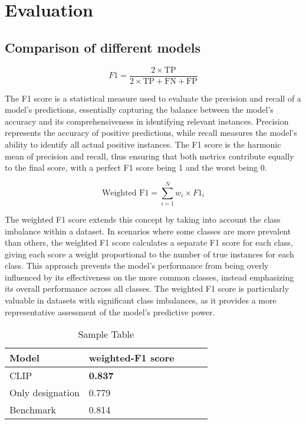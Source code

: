 \chapter{Evaluation}
\label{sec:evaluation}
\section{Comparison of different models} 

\begin{equation}
	F1 = \frac{2 \times \text{TP}}{2 \times \text{TP} + \text{FN} + \text{FP}}
\end{equation}

The F1 score is a statistical measure used to evaluate the precision and recall of a model's predictions, essentially capturing the balance between the model's accuracy and its comprehensiveness in identifying relevant instances. Precision represents the accuracy of positive predictions, while recall measures the model's ability to identify all actual positive instances. The F1 score is the harmonic mean of precision and recall, thus ensuring that both metrics contribute equally to the final score, with a perfect F1 score being 1 and the worst being 0.

\begin{equation}
	\text{Weighted F1} = \sum_{i=1}^{N} w_i \times F1_i
\end{equation}

The weighted F1 score extends this concept by taking into account the class imbalance within a dataset. In scenarios where some classes are more prevalent than others, the weighted F1 score calculates a separate F1 score for each class, giving each score a weight proportional to the number of true instances for each class. This approach prevents the model's performance from being overly influenced by its effectiveness on the more common classes, instead emphasizing its overall performance across all classes. The weighted F1 score is particularly valuable in datasets with significant class imbalances, as it provides a more representative assessment of the model's predictive power.

\begin{table}[h]
	\centering
	\begin{tabular}{|l|l|l|l|l|}
		\hline
		Model & weighted-F1 score  \\ \hline
		CLIP & \textbf{0.837}  \\ 
		Only designation & 0.779  \\ 
		Benchmark &  0.814  \\  
		\hline
	\end{tabular}
	\caption{Sample Table}
	\label{tab:my_label}
\end{table}